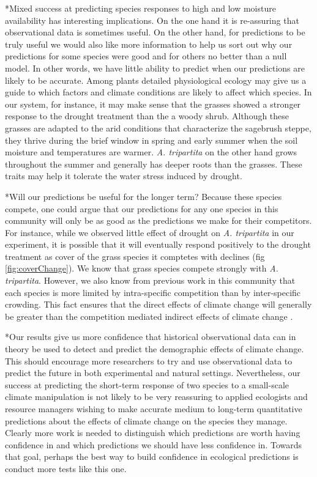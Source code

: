 \documentclass[11pt]{article}
\begin{document}
\begin{doublespacing}
*Mixed success at predicting species responses to high and low moisture availability has interesting implications.  On the one hand it is re-assuring that observational data is sometimes useful. On the other hand, for predictions to be truly useful we would also like more information to help us sort out why our predictions for some species were good and for others no better than a null model.  In other words, we have little ability to predict when our predictions are likely to be accurate.  Among plants detailed physiological ecology may give us a guide to which factors and climate conditions are likely to affect which species.  In our system, for instance, it may make sense that the grasses showed a stronger response to the drought treatment than the a woody shrub.  Although these grasses are adapted to the arid conditions that characterize the sagebrush steppe, they thrive during the brief window in spring and early summer when the soil moisture and temperatures are warmer.  \textit{A. tripartita} on the other hand grows throughout the summer and generally has deeper roots than the grasses. These traits may help it tolerate the water stress induced by drought. 

*Will our predictions be useful for the longer term? Because these species compete, one could argue that our predictions for any one species in this community will only be as good as the predictions we make for their competitors. For instance, while we observed little effect of drought on \textit{A. tripartita} in our experiment, it is possible that it will eventually respond positively to the drought treatment as cover of the grass species it comptetes with declines (fig \ref{fig:coverChange}). We know that grass species compete strongly with \textit{A. tripartita}.  However, we also know from previous work in this community that each species is more limited by intra-specific competition than by inter-specific crowding.  This fact ensures that the direct effects of climate change will generally be greater than the competition mediated indirect effects of climate change \cite{chu_direct_2016, kleinhesselink_indirect_2015}.  

*Our results give us more confidence that historical observational data can in theory be used to detect and predict the demographic effects of climate change. This should encourage more researchers to try and use observational data to predict the future in both experimental and natural settings. Nevertheless, our success at predicting the short-term response of two species to a small-scale climate manipulation is not likely to be very reassuring to applied ecologists and resource managers wishing to make accurate medium to long-term quantitative predictions about the effects of climate change on the species they manage.  Clearly more work is needed to distinguish which predictions are worth having confidence in and which predictions we should have less confidence in. Towards that goal, perhaps the best way to build confidence in ecological predictions is conduct more tests like this one.   
  

\end{doublespacing}
\end{document}
